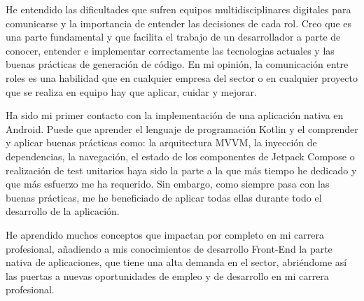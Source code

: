 He entendido las dificultades que sufren equipos multidisciplinares digitales para comunicarse y la importancia de entender las decisiones de cada rol. Creo que es una parte fundamental y que facilita el trabajo de un desarrollador a parte de conocer, entender e implementar correctamente las tecnologias actuales y las buenas prácticas de generación de código. En mi opinión, la comunicación entre roles es una habilidad que en cualquier empresa del sector o en cualquier proyecto que se realiza en equipo hay que aplicar, cuidar y mejorar.

Ha sido mi primer contacto con la implementación de una aplicación nativa en Android. Puede que aprender el lenguaje de programación Kotlin y el comprender y aplicar buenas prácticas como: la arquitectura MVVM, la inyección de dependencias, la navegación, el estado de los componentes de Jetpack Compose o realización de test unitarios haya sido la parte a la que más tiempo he dedicado y que más esfuerzo me ha requerido. Sin embargo, como siempre pasa con las buenas prácticas, me he beneficiado de aplicar todas ellas durante todo el desarrollo de la aplicación.

He aprendido muchos conceptos que impactan por completo en mi carrera profesional, añadiendo a mis conocimientos de desarrollo Front-End la parte nativa de aplicaciones, que tiene una alta demanda en el sector, abriéndome así las puertas a nuevas oportunidades de empleo y de desarrollo en mi carrera profesional.